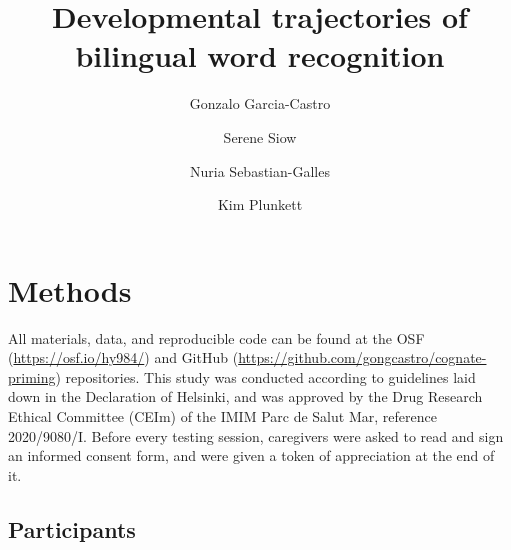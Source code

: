 \documentclass[
  letterpaper,
  DIV=11,
  numbers=noendperiod]{scrartcl}
\title{Developmental trajectories of bilingual word recognition}
\author{Gonzalo Garcia-Castro \and Serene Siow \and Nuria
Sebastian-Galles \and Kim Plunkett}
\date{}
\begin{document}
\maketitle
\ifdefined\Shaded\renewenvironment{Shaded}{\begin{tcolorbox}[interior hidden, sharp corners, frame hidden, borderline west={3pt}{0pt}{shadecolor}, breakable, boxrule=0pt, enhanced]}{\end{tcolorbox}}\fi

\hypertarget{methods}{%
\section{Methods}\label{methods}}

All materials, data, and reproducible code can be found at the OSF
(\href{https://osf.io/ckydb/}{https://osf.io/hy984/}) and GitHub
(\url{https://github.com/gongcastro/cognate-priming}) repositories. This
study was conducted according to guidelines laid down in the Declaration
of Helsinki, and was approved by the Drug Research Ethical Committee
(CEIm) of the IMIM Parc de Salut Mar, reference 2020/9080/I. Before
every testing session, caregivers were asked to read and sign an
informed consent form, and were given a token of appreciation at the end
of it.

\hypertarget{participants}{%
\subsection{Participants}\label{participants}}
\end{document}

